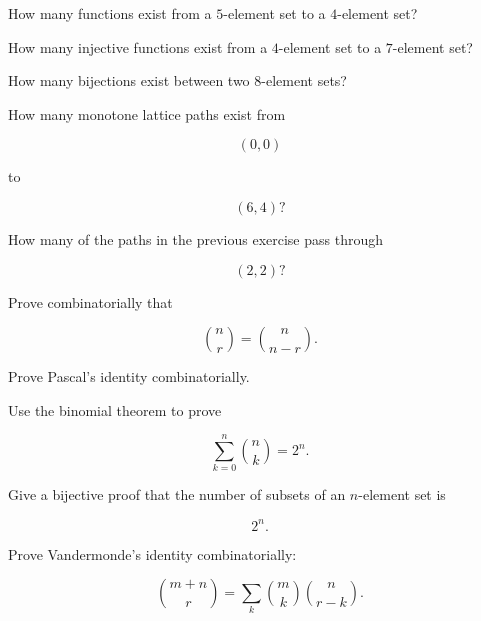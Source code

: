 \begin{exercise}[2]
How many functions exist from a \(5\)-element set to a \(4\)-element
set?
\end{exercise}

\begin{exercise}[2]
How many injective functions exist from a \(4\)-element set to a
\(7\)-element set?
\end{exercise}

\begin{exercise}[2]
How many bijections exist between two \(8\)-element sets?
\end{exercise}

\begin{exercise}[2]
How many monotone lattice paths exist from

\[
(0,0)
\]

to

\[
(6,4)?
\]
\end{exercise}

\begin{exercise}[2]
How many of the paths in the previous exercise pass through

\[
(2,2)?
\]
\end{exercise}

\begin{exercise}[2]
Prove combinatorially that

\[
\binom{n}{r}
=
\binom{n}{n-r}.
\]
\end{exercise}

\begin{exercise}[2]
Prove Pascal's identity combinatorially.
\end{exercise}

\begin{exercise}[2]
Use the binomial theorem to prove

\[
\sum_{k=0}^{n}\binom{n}{k}=2^n.
\]
\end{exercise}

\begin{exercise}[3]
Give a bijective proof that the number of subsets of an \(n\)-element
set is

\[
2^n.
\]
\end{exercise}

\begin{exercise}[3]
Prove Vandermonde's identity combinatorially:

\[
\binom{m+n}{r}
=
\sum_k
\binom{m}{k}
\binom{n}{r-k}.
\]
\end{exercise}


